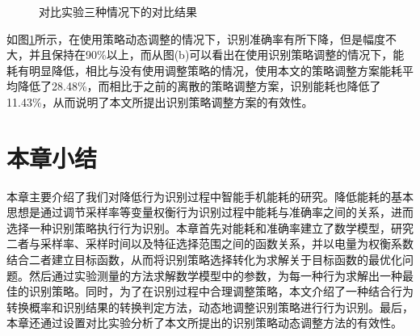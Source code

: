 \begin{figure}[htb]
    \centering
    \caption{对比实验三种情况下的对比结果}\label{com_result}
\end{figure}

\par 如图\ref{com_result}所示，在使用策略动态调整的情况下，识别准确率有所下降，但是幅度不大，并且保持在90\%以上，而从图(b)可以看出在使用识别策略调整的情况下，能耗有明显降低，相比与没有使用调整策略的情况，使用本文的策略调整方案能耗平均降低了28.48\%，而相比于之前的离散的策略调整方案，识别能耗也降低了11.43\%，从而说明了本文所提出识别策略调整方案的有效性。

\section{本章小结}
\par 本章主要介绍了我们对降低行为识别过程中智能手机能耗的研究。降低能耗的基本思想是通过调节采样率等变量权衡行为识别过程中能耗与准确率之间的关系，进而选择一种识别策略执行行为识别。本章首先对能耗和准确率建立了数学模型，研究二者与采样率、采样时间以及特征选择范围之间的函数关系，并以电量为权衡系数结合二者建立目标函数，从而将识别策略选择转化为求解关于目标函数的最优化问题。然后通过实验测量的方法求解数学模型中的参数，为每一种行为求解出一种最佳的识别策略。同时，为了在识别过程中合理调整策略，本文介绍了一种结合行为转换概率和识别结果的转换判定方法，动态地调整识别策略进行行为识别。最后，本章还通过设置对比实验分析了本文所提出的识别策略动态调整方法的有效性。